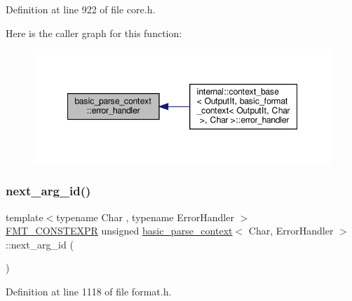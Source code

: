 Definition at line 922 of file core.\+h.

Here is the caller graph for this function\+:
\nopagebreak
\begin{figure}[H]
\begin{center}
\leavevmode
\includegraphics[width=348pt]{classbasic__parse__context_a3d7ff4e0bfe29c60c028b6d7c3ed1c1c_icgraph}
\end{center}
\end{figure}
\mbox{\label{classbasic__parse__context_aff323793124411a7c83d53f3e007b10f}} 
\subsubsection{\texorpdfstring{next\+\_\+arg\+\_\+id()}{next\_arg\_id()}}
{\footnotesize\ttfamily template$<$typename Char , typename Error\+Handler $>$ \\
\hyperlink{core_8h_a69201cb276383873487bf68b4ef8b4cd}{F\+M\+T\+\_\+\+C\+O\+N\+S\+T\+E\+X\+PR} unsigned \hyperlink{classbasic__parse__context}{basic\+\_\+parse\+\_\+context}$<$ Char, Error\+Handler $>$\+::next\+\_\+arg\+\_\+id (\begin{DoxyParamCaption}{ }\end{DoxyParamCaption})}



Definition at line 1118 of file format.\+h.

\mbox{\label{classbasic__parse__context_aaef39fb2abf13cfee75cdc54519c5322}} 
